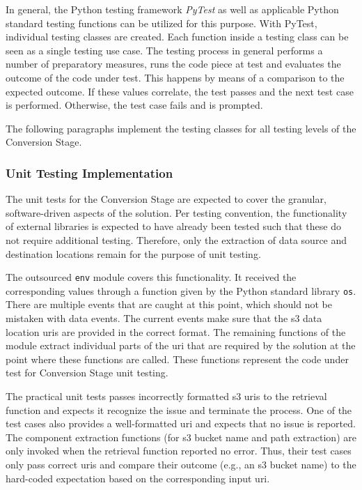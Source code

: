 In general, the Python testing framework \textit{PyTest} as well as applicable Python standard testing functions can be utilized for this purpose. With PyTest, individual testing classes are created. Each function inside a testing class can be seen as a single testing use case. The testing process in general performs a number of preparatory measures, runs the code piece at test and evaluates the outcome of the code under test. This happens by means of a comparison to the expected outcome. If these values correlate, the test passes and the next test case is performed. Otherwise, the test case fails and is prompted.

The following paragraphs implement the testing classes for all testing levels of the Conversion Stage.

\subsubsection{Unit Testing Implementation}
The unit tests for the Conversion Stage are expected to cover the granular, software-driven aspects of the solution. Per testing convention, the functionality of external libraries is expected to have already been tested such that these do not require additional testing. Therefore, only the extraction of data source and destination locations remain for the purpose of unit testing.

The outsourced \texttt{env} module covers this functionality. It received the corresponding values through a function given by the Python standard library \texttt{os}. There are multiple events that are caught at this point, which should not be mistaken with data events. The current events make sure that the \ac{s3} data location \acp{uri} are provided in the correct format. The remaining functions of the module extract individual parts of the \ac{uri} that are required by the solution at the point where these functions are called. These functions represent the code under test for Conversion Stage unit testing.

The practical unit tests passes incorrectly formatted \ac{s3} \acp{uri} to the retrieval function and expects it recognize the issue and terminate the process. One of the test cases also provides a well-formatted \ac{uri} and expects that no issue is reported. The component extraction functions (for \ac{s3} bucket name and path extraction) are only invoked when the retrieval function reported no error. Thus, their test cases only pass correct \acp{uri} and compare their outcome (e.g., an \ac{s3} bucket name) to the hard-coded expectation based on the corresponding input \ac{uri}.

